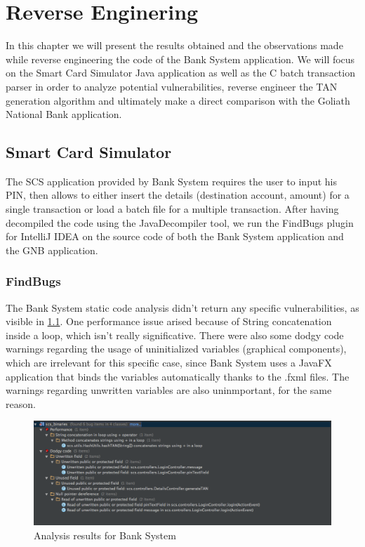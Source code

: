 \chapter{Reverse Enginering}\label{chapter:reverse_engineering}

In this chapter we will present the results obtained and the observations made while reverse engineering the code of the Bank System application.
We will focus on the Smart Card Simulator Java application as well as the C batch transaction parser in order to analyze potential vulnerabilities, reverse engineer the TAN generation algorithm and ultimately make a direct comparison with the Goliath National Bank application.

\section{Smart Card Simulator}
The SCS application provided by Bank System requires the user to input his PIN, then allows to either insert the details (destination account, amount) for a single transaction or load a batch file for a multiple transaction.\newline
After having decompiled the code using the JavaDecompiler tool, we run the FindBugs plugin for IntelliJ IDEA on the source code of both the Bank System application and the GNB application.\newline

\subsection{FindBugs}
The Bank System static code analysis didn't return any specific vulnerabilities, as visible in \ref{figure:bs_findBugs}.\newline
One performance issue arised because of String concatenation inside a loop, which isn't really significative. There were also some dodgy code warnings regarding the usage of uninitialized variables (graphical components), which are irrelevant for this specific case, since Bank System uses a JavaFX application that binds the variables automatically thanks to the .fxml files. The warnings regarding unwritten variables are also uninmportant, for the same reason.

\begin{figure}[h!tbp]
	\centering
	\includegraphics[width=\textwidth]{figures/bs_findBugs}
	\caption{Analysis results for Bank System}
	\label{figure:bs_findBugs}
\end{figure}

